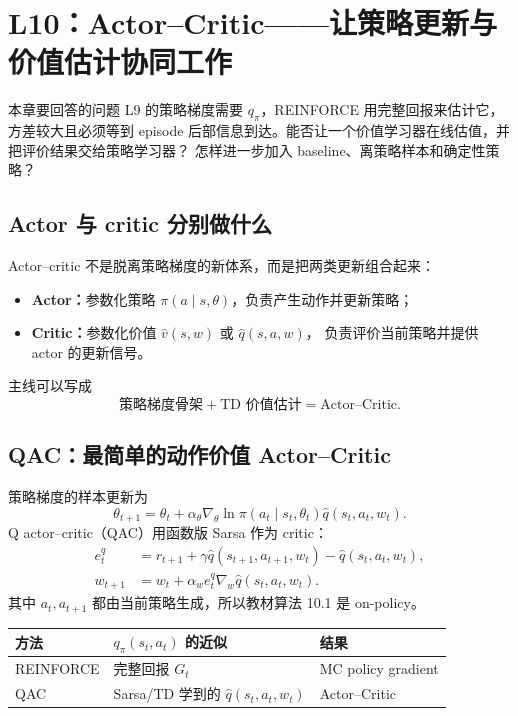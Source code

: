 \documentclass[11pt,a4paper,fontset=fandol]{ctexart}
\begin{document}
\clearpage
\section{L10：Actor--Critic——让策略更新与价值估计协同工作}

\begin{goalbox}{本章要回答的问题}
L9 的策略梯度需要 \(q_\pi\)，REINFORCE 用完整回报来估计它，方差较大且必须等到
episode 后部信息到达。能否让一个价值学习器在线估值，并把评价结果交给策略学习器？
怎样进一步加入 baseline、离策略样本和确定性策略？
\end{goalbox}

\subsection{Actor 与 critic 分别做什么}

Actor--critic 不是脱离策略梯度的新体系，而是把两类更新组合起来：

\begin{itemize}
  \item \textbf{Actor：}参数化策略 \(\pi(a\mid s,\theta)\)，负责产生动作并更新策略；
  \item \textbf{Critic：}参数化价值 \(\hat v(s,w)\) 或 \(\hat q(s,a,w)\)，
  负责评价当前策略并提供 actor 的更新信号。
\end{itemize}

主线可以写成
\[
\boxed{
\text{策略梯度骨架}
+\text{TD 价值估计}
=\text{Actor--Critic}}.
\]

\subsection{QAC：最简单的动作价值 Actor--Critic}

策略梯度的样本更新为
\[
\theta_{t+1}
=\theta_t+\alpha_\theta
\nabla_\theta\ln\pi(a_t\mid s_t,\theta_t)
\hat q(s_t,a_t,w_t).
\]
Q actor--critic（QAC）用函数版 Sarsa 作为 critic：
\[
\begin{aligned}
e_t^q
&=r_{t+1}
+\gamma\hat q(s_{t+1},a_{t+1},w_t)
-\hat q(s_t,a_t,w_t),\\
w_{t+1}
&=w_t+\alpha_w e_t^q
\nabla_w\hat q(s_t,a_t,w_t).
\end{aligned}
\]
其中 \(a_t,a_{t+1}\) 都由当前策略生成，所以教材算法 10.1 是 on-policy。

\begin{center}
\begin{tabularx}{\textwidth}{
  >{\raggedright\arraybackslash}p{}
  >{\raggedright\arraybackslash}p{} X}
\toprule
方法 & \(q_\pi(s_t,a_t)\) 的近似 & 结果\\
\midrule
REINFORCE & 完整回报 \(G_t\) & MC policy gradient\\
QAC & Sarsa/TD 学到的 \(\hat q(s_t,a_t,w_t)\) & Actor--Critic\\
\bottomrule
\end{tabularx}
\end{center}
\end{document}
